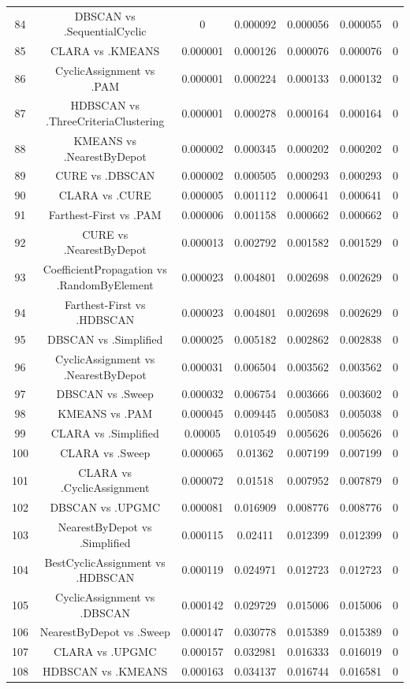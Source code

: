 \documentclass[a4paper,10pt]{article}
\begin{document}
\begin{landscape}
\begin{table}[!htp]
\begin{tabular}{ccccccc}
84&DBSCAN vs .SequentialCyclic&0&0.000092&0.000056&0.000055&0\\
85&CLARA vs .KMEANS&0.000001&0.000126&0.000076&0.000076&0\\
86&CyclicAssignment vs .PAM&0.000001&0.000224&0.000133&0.000132&0\\
87&HDBSCAN vs .ThreeCriteriaClustering&0.000001&0.000278&0.000164&0.000164&0\\
88&KMEANS vs .NearestByDepot&0.000002&0.000345&0.000202&0.000202&0\\
89&CURE vs .DBSCAN&0.000002&0.000505&0.000293&0.000293&0\\
90&CLARA vs .CURE&0.000005&0.001112&0.000641&0.000641&0\\
91&Farthest-First vs .PAM&0.000006&0.001158&0.000662&0.000662&0\\
92&CURE vs .NearestByDepot&0.000013&0.002792&0.001582&0.001529&0\\
93&CoefficientPropagation vs .RandomByElement&0.000023&0.004801&0.002698&0.002629&0\\
94&Farthest-First vs .HDBSCAN&0.000023&0.004801&0.002698&0.002629&0\\
95&DBSCAN vs .Simplified&0.000025&0.005182&0.002862&0.002838&0\\
96&CyclicAssignment vs .NearestByDepot&0.000031&0.006504&0.003562&0.003562&0\\
97&DBSCAN vs .Sweep&0.000032&0.006754&0.003666&0.003602&0\\
98&KMEANS vs .PAM&0.000045&0.009445&0.005083&0.005038&0\\
99&CLARA vs .Simplified&0.00005&0.010549&0.005626&0.005626&0\\
100&CLARA vs .Sweep&0.000065&0.01362&0.007199&0.007199&0\\
101&CLARA vs .CyclicAssignment&0.000072&0.01518&0.007952&0.007879&0\\
102&DBSCAN vs .UPGMC&0.000081&0.016909&0.008776&0.008776&0\\
103&NearestByDepot vs .Simplified&0.000115&0.02411&0.012399&0.012399&0\\
104&BestCyclicAssignment vs .HDBSCAN&0.000119&0.024971&0.012723&0.012723&0\\
105&CyclicAssignment vs .DBSCAN&0.000142&0.029729&0.015006&0.015006&0\\
106&NearestByDepot vs .Sweep&0.000147&0.030778&0.015389&0.015389&0\\
107&CLARA vs .UPGMC&0.000157&0.032981&0.016333&0.016019&0\\
108&HDBSCAN vs .KMEANS&0.000163&0.034137&0.016744&0.016581&0\\

\end{tabular}
\end{table}
\end{landscape}
\end{document}
